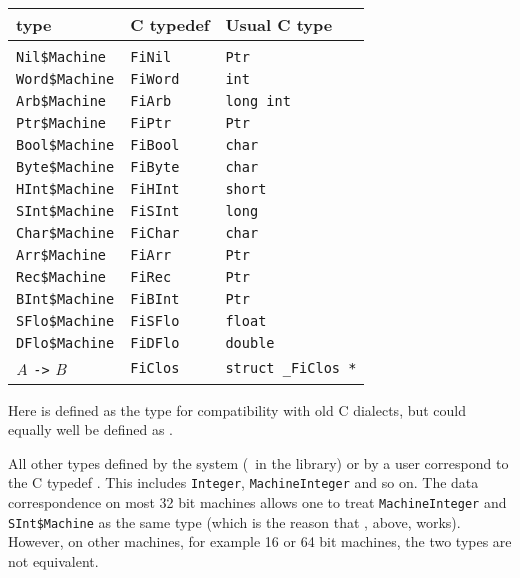 {\tt
\begin{tabular}{lll}
\asharp{} type &  C typedef &  Usual C type \\
\hline \\
 \verb+Nil$Machine+          &  \verb+FiNil+      &  \verb+Ptr+       \\
 \verb+Word$Machine+         &  \verb+FiWord+     &  \verb+int+       \\
 \verb+Arb$Machine+          &  \verb+FiArb+      &  \verb+long int+  \\
 \verb+Ptr$Machine+          &  \verb+FiPtr+      &  \verb+Ptr+       \\
 \verb+Bool$Machine+         &  \verb+FiBool+     &  \verb+char+      \\
 \verb+Byte$Machine+         &  \verb+FiByte+     &  \verb+char+      \\
 \verb+HInt$Machine+         &  \verb+FiHInt+     &  \verb+short+     \\
 \verb+SInt$Machine+         &  \verb+FiSInt+     &  \verb+long+      \\
 \verb+Char$Machine+         &  \verb+FiChar+     &  \verb+char+      \\
 \verb+Arr$Machine+          &  \verb+FiArr+      &  \verb+Ptr+       \\
 \verb+Rec$Machine+          &  \verb+FiRec+      &  \verb+Ptr+       \\
 \verb+BInt$Machine+         &  \verb+FiBInt+     &  \verb+Ptr+       \\
 \verb+SFlo$Machine+         &  \verb+FiSFlo+     &  \verb+float+     \\
 \verb+DFlo$Machine+         &  \verb+FiDFlo+     &  \verb+double+    \\
 {\em A\/} \verb"->" {\em B} &  \verb+FiClos+     &  \verb+struct _FiClos *+ \\
\end{tabular}
}

Here  is defined as the type  for compatibility
with old C dialects, but could equally well be defined as .

All other \asharp{} types defined by the system (\eg{}~in the
\libaldor{} library) or by a user correspond to the C 
typedef
. This includes {\tt Integer}, {\tt MachineInteger} and so
on. The data correspondence on most 32 bit machines allows one to
treat {\tt MachineInteger} and \verb+SInt$Machine+ as the same type
(which is the reason that , above, works). However, on
other machines, for example 16 or 64 bit machines, the two types are
not equivalent.

